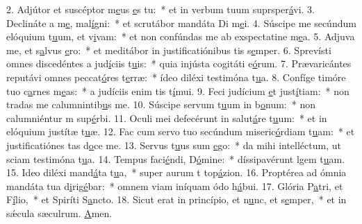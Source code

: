 2. Adjútor et suscéptor m\uline{e}us \uline{e}s tu:~* et in verbum tuum suprsper\uline{á}vi.
3. Declináte a m\uline{e}, mal\uline{í}gni:~* et scrutábor mandáta Di m\uline{e}i.
4. Súscipe me secúndum elóquium t\uline{u}um, et v\uline{i}vam:~* et non confúndas me ab exspectatine m\uline{e}a.
5. Adjuva me, et s\uline{a}lvus \uline{e}ro:~* et meditábor in justificatiónibus tis s\uline{e}mper.
6. Sprevísti omnes discedéntes a jud\uline{í}ciis t\uline{u}is:~* quia injústa cogitáti e\uline{ó}rum.
7. Prævaricántes reputávi omnes peccat\uline{ó}res t\uline{e}rræ:~* ídeo diléxi testimóna t\uline{u}a.
8. Confíge timóre tuo c\uline{a}rnes m\uline{e}as:~* a judíciis enim tis t\uline{í}mui.
9. Feci judícium \uline{e}t just\uline{í}tiam:~* non tradas me calumnintib\uline{u}s me.
10. Súscipe servum t\uline{u}um in b\uline{o}num:~* non calumniéntur m sup\uline{é}rbi.
11. Oculi mei defecérunt in salut\uline{á}re t\uline{u}um:~* et in elóquium justítæ t\uline{u}æ.
12. Fac cum servo tuo secúndum miseric\uline{ó}rdiam t\uline{u}am:~* et justificatiónes tas d\uline{o}ce me.
13. Servus t\uline{u}us sum \uline{e}go:~* da mihi intelléctum, ut sciam testimóna t\uline{u}a.
14. Tempus faci\uline{é}ndi, D\uline{ó}mine:~* díssipavérunt lgem t\uline{u}am.
15. Ideo diléxi mand\uline{á}ta t\uline{u}a,~* super aurum t top\uline{á}zion.
16. Proptérea ad ómnia mandáta tua d\uline{i}rig\uline{é}bar:~* omnem viam iníquam ódo h\uline{á}bui.
17. Glória P\uline{a}tri, et F\uline{í}lio,~* et Spiríti S\uline{a}ncto.
18. Sicut erat in princípio, et n\uline{u}nc, et s\uline{e}mper,~* et in sǽcula sæculrum. \uline{A}men.

